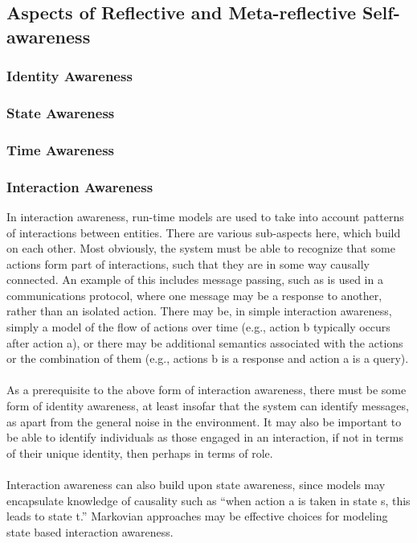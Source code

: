 \documentclass{article}
\begin{document}
			\subsection{Aspects of Reflective and Meta-reflective Self-awareness}
				\subsubsection{Identity Awareness}
				\subsubsection{State Awareness}
				\subsubsection{Time Awareness}
				\subsubsection{Interaction Awareness}In interaction awareness, run-time models are used to take into account patterns of interactions between entities. There are various sub-aspects here, which build on each other. Most obviously, the system must be able to recognize that some actions form part of interactions, such that they are in some way causally connected. An example of this includes message passing, such as is used in a communications protocol, where one message may be a response to another, rather than an isolated action.
				There may be, in simple interaction awareness, simply a model of the flow of actions over time (e.g., action b typically occurs after action a), or there may be additional semantics associated with the actions or the combination of them (e.g., actions b is a response and action a is a query).
					\paragraph{} As a prerequisite to the above form of interaction awareness, there must be some form of identity awareness, at least insofar that the system can identify messages, as apart from the general noise in the environment. It may also be important to be able to identify individuals as those engaged in an interaction, if not in terms of their
					unique identity, then perhaps in terms of role.
					\paragraph{} Interaction awareness can also build upon state awareness, since models may encapsulate knowledge of causality such as “when action a is taken in state s, this leads to state t.” Markovian approaches may be effective choices for modeling state based interaction awareness.
\end{document}
